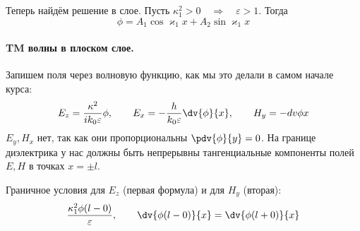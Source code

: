 Теперь найдём решение в слое. Пусть $\kappa_1^2>0  \quad\Rightarrow\quad  \varepsilon>1$. Тогда
\begin{equation}
    \phi = A_1 \cos \varkappa_1 x + A_2 \sin \varkappa_1 x
\end{equation}

\paragraph{TM волны в плоском слое.} Запишем поля через волновую функцию, как мы это делали в самом начале курса:
\begin{equation}
    E_z = \frac{\kappa^2}{ik_0 \varepsilon}\phi, \qquad
    E_x = -\frac{h}{k_0 \varepsilon} \dv{\phi}{x}, \qquad
    H_y = -dv{\phi}{x}
\end{equation}
$E_y, H_x$ нет, так как они пропорциональны $\pdv{\phi}{y}=0$.
На границе диэлектрика у нас должны быть непрерывны тангенциальные компоненты полей $E,H$ в точках $x=\pm l$.

Граничное условия для $E_z$ (первая формула) и для $H_y$ (вторая):
\begin{equation}
    \frac{\kappa_1^2 \phi(l-0)}{\varepsilon}, \qquad
    \dv{\phi(l-0)}{x} = \dv{\phi(l+0)}{x}
\end{equation}
